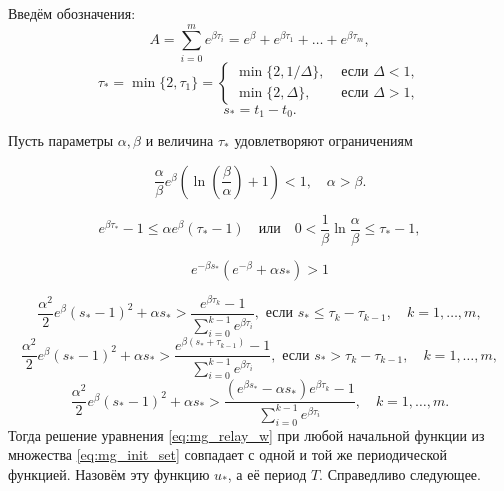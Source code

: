 Введём обозначения:
%
\begin{equation*}
	A = \sum_{i=0}^{m}e^{\beta \tau_{i}}=e^\beta+e^{\beta \tau_1}+\ldots+e^{\beta \tau_{m}},
\end{equation*}
\begin{equation*}
	\tau_* = \min\{2,\tau_1\}=\left\lbrace\begin{array}{cl}
		\min\{2,1/\Delta\}, & \text{ если } \Delta<1,
		\\
		\min\{2,\Delta\}, & \text{ если } \Delta>1,
	\end{array}\right.
\end{equation*}
\begin{equation*}
	s_* = t_1-t_0.
\end{equation*}

\begin{theorem}
	\label{thm:mg_auxiliary_main}
	Пусть параметры $\alpha, \beta$ и величина $\tau_*$ удовлетворяют ограничениям
	
	\begin{equation}
		\label{eq:cond_thm1}
		\frac{\alpha}{\beta}e^{\beta}\left(\ln\left(\frac{\beta}{\alpha}\right)+1\right) < 1,
		\quad
		\alpha > \beta.
	\end{equation}
	
	\begin{equation}
		\label{eq:cond_thm2}
		e^{\beta \tau_*}-1 \leqslant \alpha e^\beta(\tau_*-1)
		\quad\text{или}\quad
		0 < \frac{1}{\beta}\ln\frac{\alpha}{\beta}\leqslant\tau_*-1,
	\end{equation}
	
	\begin{equation}
		\label{eq:cond_th_w>1_t_1+1}
		e^{-\beta s_*}(e^{-\beta}+\alpha s_*)>1
	\end{equation}
	
	\begin{equation}
		\label{eq:cond_hair_hair_01}
		\frac{\alpha^2}{2}e^\beta(s_*-1)^2+\alpha s_*>\frac{e^{\beta \tau_k}-1}{\sum_{i=0}^{k-1}e^{\beta \tau_i}},\text{ если } s_*\leqslant \tau_k-\tau_{k-1},\quad k=1,\ldots,m,
	\end{equation}
	\begin{equation}
		\label{eq:cond_hair_hair_02}
		\frac{\alpha^2}{2}e^\beta(s_*-1)^2+\alpha s_*>\frac{e^{\beta (s_*+\tau_{k-1})}-1}{\sum_{i=0}^{k-1}e^{\beta \tau_i}},\text{ если } s_* > \tau_k-\tau_{k-1},\quad k=1,\ldots,m,
	\end{equation}
	\begin{equation}
		\label{eq:cond_hair_hair_1}
		\frac{\alpha^2}{2}e^\beta( s_*-1)^2+\alpha s_*>\frac{(e^{\beta s_*}-\alpha s_*)e^{\beta \tau_k}-1}{\sum_{i=0}^{k-1}e^{\beta \tau_i}},\quad k=1,\ldots,m.
	\end{equation}
	Тогда решение уравнения \eqref{eq:mg_relay_w} при любой начальной функции из множества \eqref{eq:mg_init_set} совпадает с одной и той же периодической функцией. Назовём эту функцию $u_*$, а её период $T$. Справедливо следующее.
	

\end{theorem}
